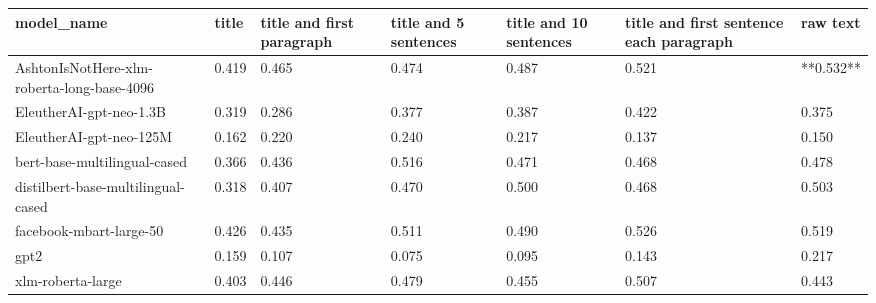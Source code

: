 \begin{tabular}{lllllll}
\toprule
                                model\_name & title & title and first paragraph & title and 5 sentences & title and 10 sentences & title and first sentence each paragraph &  raw text \\
\midrule
AshtonIsNotHere-xlm-roberta-long-base-4096 & 0.419 &                     0.465 &                 0.474 &                  0.487 &                                   0.521 & **0.532** \\
                   EleutherAI-gpt-neo-1.3B & 0.319 &                     0.286 &                 0.377 &                  0.387 &                                   0.422 &     0.375 \\
                   EleutherAI-gpt-neo-125M & 0.162 &                     0.220 &                 0.240 &                  0.217 &                                   0.137 &     0.150 \\
              bert-base-multilingual-cased & 0.366 &                     0.436 &                 0.516 &                  0.471 &                                   0.468 &     0.478 \\
        distilbert-base-multilingual-cased & 0.318 &                     0.407 &                 0.470 &                  0.500 &                                   0.468 &     0.503 \\
                   facebook-mbart-large-50 & 0.426 &                     0.435 &                 0.511 &                  0.490 &                                   0.526 &     0.519 \\
                                      gpt2 & 0.159 &                     0.107 &                 0.075 &                  0.095 &                                   0.143 &     0.217 \\
                         xlm-roberta-large & 0.403 &                     0.446 &                 0.479 &                  0.455 &                                   0.507 &     0.443 \\
\bottomrule
\end{tabular}
